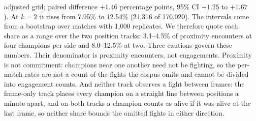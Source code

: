 adjusted grid; paired difference $+1.46$ percentage points, 95\% CI $+1.25$ to $+1.67$). At $k = 2$ it rises
from 7.95\% to 12.54\% (21,316 of 170,020). The intervals come from a bootstrap over matches with 1,000
replicates. We therefore quote each share as a range over the two position tracks: 3.1--4.5\% of
proximity encounters at four champions per side and 8.0--12.5\% at two.
Three cautions govern these numbers. Their denominator is proximity encounters, not engagements.
Proximity is not commitment: champions near one another need not be fighting, so the per-match rates are
not a count of the fights the corpus omits and cannot be divided into engagement counts. And neither
track observes a fight between frames: the frame-only track places every champion on a straight line
between positions a minute apart, and on both tracks a champion counts as alive if it was alive at the
last frame, so neither share bounds the omitted fights in either direction.

